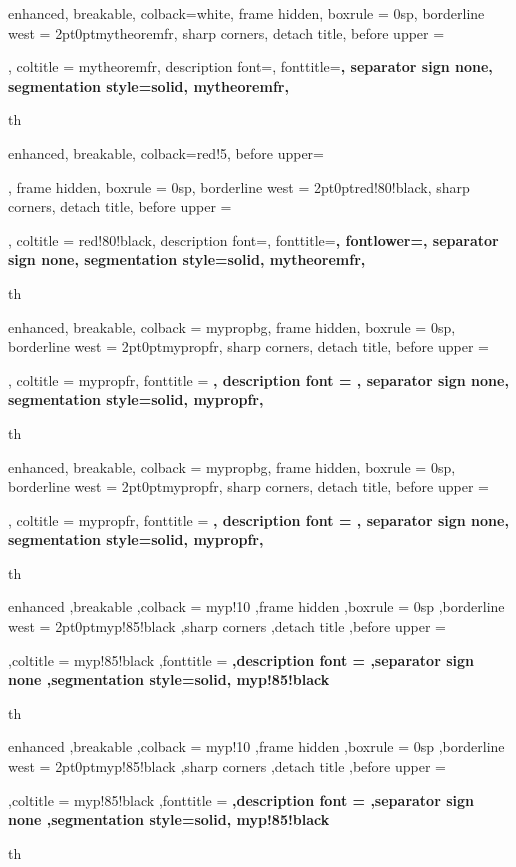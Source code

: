 {
	enhanced,
	breakable,
	colback=white,
	frame hidden,
	boxrule = 0sp,
	borderline west = {2pt}{0pt}{mytheoremfr},
	sharp corners,
	detach title,
	before upper = \tcbtitle\par\smallskip,
	coltitle = mytheoremfr,
	description font=\selectfont,
	fonttitle=\selectfont\bfseries,
	separator sign none,
	segmentation style={solid, mytheoremfr},
}
{th}

{
enhanced,
breakable,
colback=red!5,
  before upper=\tcbtitle\par\Hugeskip,
frame hidden,
boxrule = 0sp,
borderline west = {2pt}{0pt}{red!80!black},
sharp corners,
detach title,
before upper = \tcbtitle\par\smallskip,
coltitle = red!80!black,
description font=\mdseries{}\selectfont,
fonttitle=\selectfont\bfseries,
fontlower=\selectfont,
  separator sign none,
segmentation style={solid, mytheoremfr},
}
{th}

{%
	enhanced,
	breakable,
	colback = mypropbg,
	frame hidden,
	boxrule = 0sp,
	borderline west = {2pt}{0pt}{mypropfr},
	sharp corners,
	detach title,
	before upper = \tcbtitle\par\smallskip,
	coltitle = mypropfr,
	fonttitle = \bfseries\sffamily,
	description font = \mdseries,
	separator sign none,
	segmentation style={solid, mypropfr},
}
{th}


{%
	enhanced,
	breakable,
	colback = mypropbg,
	frame hidden,
	boxrule = 0sp,
	borderline west = {2pt}{0pt}{mypropfr},
	sharp corners,
	detach title,
	before upper = \tcbtitle\par\smallskip,
	coltitle = mypropfr,
	fonttitle = \bfseries\sffamily,
	description font = \mdseries,
	separator sign none,
	segmentation style={solid, mypropfr},
}
{th}


{%
	enhanced
	,breakable
	,colback = myp!10
	,frame hidden
	,boxrule = 0sp
	,borderline west = {2pt}{0pt}{myp!85!black}
	,sharp corners
	,detach title
	,before upper = \tcbtitle\par\smallskip
	,coltitle = myp!85!black
	,fonttitle = \bfseries\sffamily
	,description font = \mdseries
	,separator sign none
	,segmentation style={solid, myp!85!black}
}
{th}
{%
	enhanced
	,breakable
	,colback = myp!10
	,frame hidden
	,boxrule = 0sp
	,borderline west = {2pt}{0pt}{myp!85!black}
	,sharp corners
	,detach title
	,before upper = \tcbtitle\par\smallskip
	,coltitle = myp!85!black
	,fonttitle = \bfseries\sffamily
	,description font = \mdseries
	,separator sign none
	,segmentation style={solid, myp!85!black}
}
{th}


